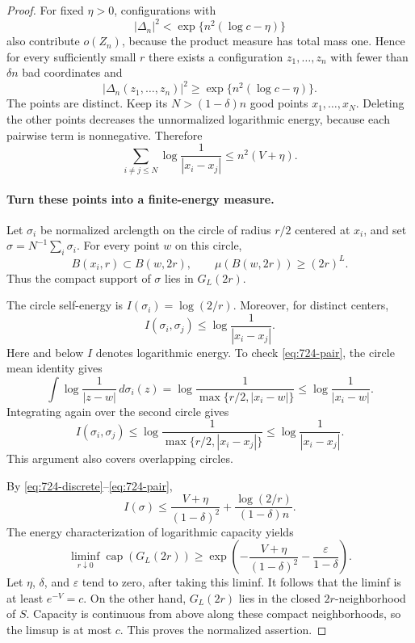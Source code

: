 \documentclass[11pt,a4paper]{article}
\theoremstyle{remark}
\begin{document}
\begin{proof}
For fixed $\eta>0$, configurations with
\[
 |\Delta_n|^2<\exp\{n^2(\log c-\eta)\}
\]
also contribute $o(Z_n)$, because the product measure has total mass one. Hence for every sufficiently small $r$ there exists a configuration $z_1,\ldots,z_n$ with fewer than $\delta n$ bad coordinates and
\[
 |\Delta_n(z_1,\ldots,z_n)|^2
 \ge\exp\{n^2(\log c-\eta)\}.
\]
The points are distinct. Keep its $N>(1-\delta)n$ good points $x_1,\ldots,x_N$. Deleting the other points decreases the unnormalized logarithmic energy, because each pairwise term is nonnegative. Therefore
\begin{equation}\label{eq:724-discrete}
 \sum_{i\ne j\le N}\log\frac1{|x_i-x_j|}
 \le n^2(V+\eta).
\end{equation}

\paragraph{Turn these points into a finite-energy measure.}
Let $\sigma_i$ be normalized arclength on the circle of radius $r/2$ centered at $x_i$, and set $\sigma=N^{-1}\sum_i\sigma_i$. For every point $w$ on this circle,
\[
 B(x_i,r)\subset B(w,2r),\qquad
 \mu(B(w,2r))\ge(2r)^L.
\]
Thus the compact support of $\sigma$ lies in $G_L(2r)$.

The circle self-energy is $I(\sigma_i)=\log(2/r)$. Moreover, for distinct centers,
\begin{equation}\label{eq:724-pair}
 I(\sigma_i,\sigma_j)\le\log\frac1{|x_i-x_j|}.
\end{equation}
Here and below $I$ denotes logarithmic energy. To check \eqref{eq:724-pair}, the circle mean identity gives
\[
 \int\log\frac1{|z-w|}\,d\sigma_i(z)
 =\log\frac1{\max\{r/2,|x_i-w|\}}
 \le\log\frac1{|x_i-w|}.
\]
Integrating again over the second circle gives
\[
 I(\sigma_i,\sigma_j)
 \le\log\frac1{\max\{r/2,|x_i-x_j|\}}
 \le\log\frac1{|x_i-x_j|}.
\]
This argument also covers overlapping circles.

By \eqref{eq:724-discrete}--\eqref{eq:724-pair},
\[
 I(\sigma)
 \le\frac{V+\eta}{(1-\delta)^2}
 +\frac{\log(2/r)}{(1-\delta)n}.
\]
The energy characterization of logarithmic capacity yields
\[
 \liminf_{r\downarrow0}\operatorname{cap}(G_L(2r))
 \ge\exp\left(-\frac{V+\eta}{(1-\delta)^2}
              -\frac{\varepsilon}{1-\delta}\right).
\]
Let $\eta$, $\delta$, and $\varepsilon$ tend to zero, after taking this liminf. It follows that the liminf is at least $e^{-V}=c$.
On the other hand, $G_L(2r)$ lies in the closed $2r$-neighborhood of $S$. Capacity is continuous from above along these compact neighborhoods, so the limsup is at most $c$. This proves the normalized assertion.


\end{proof}
\end{document}
